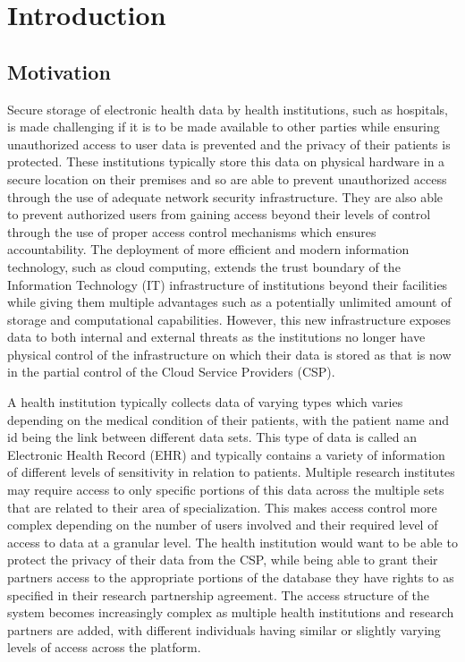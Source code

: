 \chapter{Introduction}
\label{chap:introduction}


\section{Motivation}

Secure storage of electronic health data by health institutions, such as hospitals, is made challenging if it is to be made available to other parties while ensuring unauthorized access to user data is prevented and the privacy of their patients is protected. These institutions typically store this data on physical hardware in a secure location on their premises and so are able to prevent unauthorized access through the use of adequate network security infrastructure. They are also able to prevent authorized users from gaining access beyond their levels of control through the use of proper access control mechanisms which ensures accountability. The deployment of more efficient and modern information technology, such as cloud computing, extends the trust boundary of the Information Technology (IT) infrastructure of institutions beyond their facilities while giving them multiple advantages such as a potentially unlimited amount of storage and computational capabilities. However, this new infrastructure exposes data to both internal and external threats as the institutions no longer have physical control of the infrastructure on which their data is stored as that is now in the partial control of the Cloud Service Providers (CSP).

A health institution typically collects data of varying types which varies depending on the medical condition of their patients, with the patient name and id being the link between different data sets. This type of data is called an Electronic Health Record (EHR) \cite{caninfoway, ehrhealthitmain} and typically contains a variety of information of different levels of sensitivity in relation to patients. Multiple research institutes may require access to only specific portions of this data across the multiple sets that are related to their area of specialization. This makes access control more complex depending on the number of users involved and their required level of access to data at a granular level. The health institution would want to be able to protect the privacy of their data from the CSP, while being able to grant their partners access to the appropriate portions of the database they have rights to as specified in their research partnership agreement. The access structure of the system becomes increasingly complex as multiple health institutions and research partners are added, with different individuals having similar or slightly varying levels of access across the platform.

